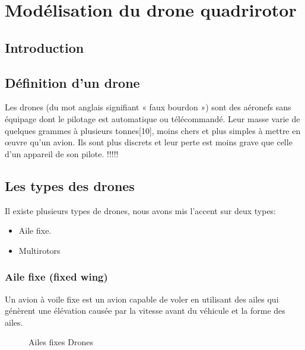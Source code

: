 \documentclass[a4paper,12pt]{report}
\begin{document}
	
	
	\chapter{Modélisation du drone quadrirotor }
	\newpage
	
	\section{Introduction}

	
	
	\section{Définition d'un drone}
	
Les drones (du mot anglais signifiant « faux bourdon ») sont des aéronefs sans équipage dont le pilotage est automatique ou télécommandé. Leur masse varie de quelques grammes à plusieurs tonnes[10], moins chers et plus simples à mettre en œuvre qu'un avion. Ils sont plus discrets et leur perte est moins grave que celle d'un appareil de son pilote.  !!!!!
	
	
	
	\section{Les types des drones}
	Il existe plusieurs types de drones, nous avons mis l'accent sur deux types:
	\begin{itemize}
	 \item Aile fixe.
	 \item Multirotors 
	\end{itemize}
	\subsection{Aile fixe (fixed wing)}
	Un avion à voile fixe est un avion capable de voler en utilisant des ailes qui génèrent une élévation causée par la vitesse avant du véhicule et la forme des ailes.
	
	
	\begin{figure}[h] 
	\begin{center} 
		\centering
		
	\end{center}
	
	\caption{Ailes fixes Drones}
	\end{figure}
\end{document}
